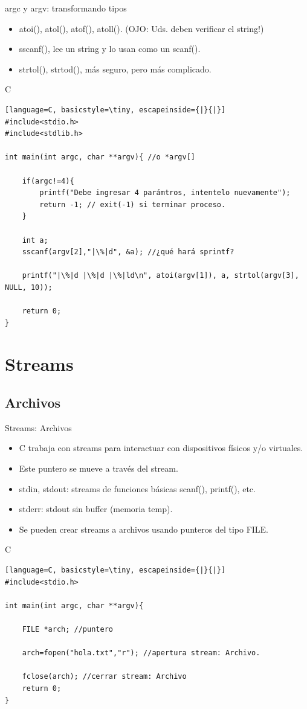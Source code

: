 \documentclass{beamer}
\begin{document}
\begin{frame}[fragile]{argc y argv: transformando tipos}
\begin{itemize}
	\item atoi(), atol(), atof(), atoll(). (OJO: Uds. deben verificar el string!)
	\item sscanf(), lee un string y lo usan como un scanf().
	\item strtol(), strtod(), más seguro, pero más complicado.
\end{itemize}

\begin{exampleblock}{C}
\begin{lstlisting}[language=C, basicstyle=\tiny, escapeinside={|}{|}]
#include<stdio.h>
#include<stdlib.h>

int main(int argc, char **argv){ //o *argv[]

	if(argc!=4){
		printf("Debe ingresar 4 parámtros, intentelo nuevamente");
		return -1; // exit(-1) si terminar proceso.
	}

	int a;
	sscanf(argv[2],"|\%|d", &a); //¿qué hará sprintf?

	printf("|\%|d |\%|d |\%|ld\n", atoi(argv[1]), a, strtol(argv[3], NULL, 10));

	return 0;
}
\end{lstlisting}
\end{exampleblock}
\end{frame}

\section{Streams}
\subsection{Archivos}
\begin{frame}[fragile]{Streams: Archivos}
\begin{itemize}
	\item C trabaja con streams para interactuar con dispositivos físicos y/o virtuales.
	\item Este puntero se mueve a través del stream. 
	\item stdin, stdout: streams de funciones básicas scanf(), printf(), etc.
	\item stderr: stdout sin buffer (memoria temp).
	\item Se pueden crear streams a archivos usando punteros del tipo FILE.
\end{itemize}
\begin{exampleblock}{C}
\begin{lstlisting}[language=C, basicstyle=\tiny, escapeinside={|}{|}]
#include<stdio.h>

int main(int argc, char **argv){

	FILE *arch; //puntero

	arch=fopen("hola.txt","r"); //apertura stream: Archivo.

	fclose(arch); //cerrar stream: Archivo
	return 0;
}
\end{lstlisting}
\end{exampleblock}
\end{frame}
\end{document}
